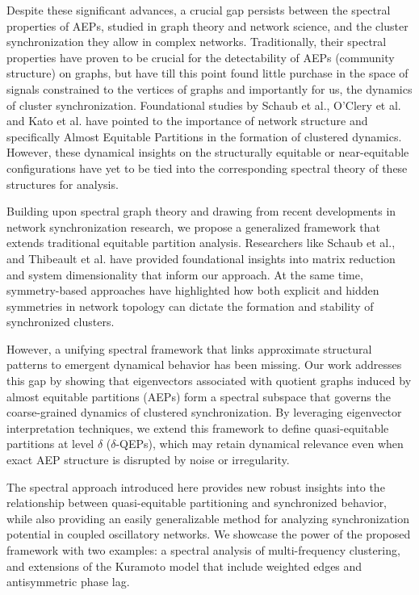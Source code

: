 \documentclass[%
 aip,
 amsmath,amssymb,
preprint,
reprint, onecolumn %
]{revtex4-1}
\begin{document}
Despite these significant advances, a crucial gap persists between the spectral properties of AEPs, studied in graph theory and network science, and the cluster synchronization they allow in complex networks. Traditionally, their spectral properties have proven to be crucial for the detectability of AEPs (community structure) on graphs,\cite{zhang_almost_2021, krzakala_spectral_2013} but have till this point found little purchase in the space of  signals constrained to the vertices of graphs and importantly for us, the dynamics of cluster synchronization.
Foundational studies by Schaub et al.,\cite{schaub_graph_2016} O'Clery et al.\cite{OClery_Observability_2013} and Kato et al.\cite{kato_cluster_2023} have pointed to the importance of network structure and specifically Almost Equitable Partitions in the formation of clustered dynamics.
However, these dynamical insights on the structurally equitable or near-equitable configurations have yet to be tied into the corresponding spectral theory of these structures for analysis.

Building upon spectral graph theory and drawing from recent developments in network synchronization research, we propose a generalized framework that extends traditional equitable partition analysis. Researchers like Schaub et al., and Thibeault et al.\cite{schaub_hierarchical_2023, thibeault_threefold_2020,thibeault_low-rank_2024} have provided foundational insights into matrix reduction and system dimensionality that inform our approach.
At the same time, symmetry-based approaches\cite{cho_stable_2017, zhang_symmetry-independent_2020, pecora_cluster_2014, khanra_identifying_2022} have highlighted how both explicit and hidden symmetries in network topology can dictate the formation and stability of synchronized clusters. 

However, a unifying spectral framework that links approximate structural patterns to emergent dynamical behavior has been missing. Our work addresses this gap by showing that eigenvectors associated with quotient graphs induced by almost equitable partitions (AEPs) form a spectral subspace that governs the coarse-grained dynamics of clustered synchronization. By leveraging eigenvector interpretation techniques,\cite{shuman_emerging_2013} we extend this framework to define quasi-equitable partitions at level $\delta$ ($\delta$-QEPs), which may retain dynamical relevance even when exact AEP structure is disrupted by noise or irregularity.

The spectral approach introduced here provides new robust insights into the relationship between quasi-equitable partitioning and synchronized behavior, while also providing an easily generalizable method for analyzing synchronization potential in coupled oscillatory networks. We showcase the power of the proposed framework with two examples: a spectral analysis of multi-frequency clustering, and extensions of the Kuramoto model that include weighted edges and antisymmetric phase lag.
\end{document}
